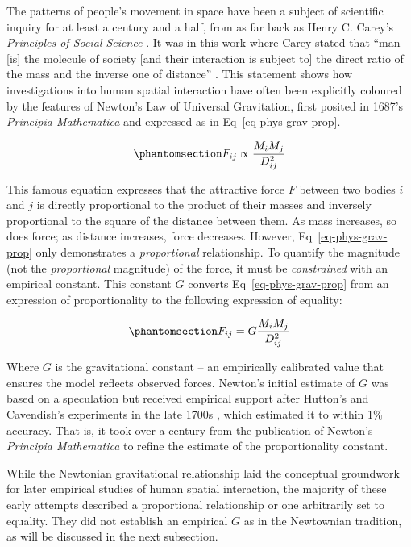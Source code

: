 \documentclass[
  10pt,
  letterpaper,
]{article}
\begin{document}
The patterns of people's movement in space have been a subject of
scientific inquiry for at least a century and a half, from as far back
as Henry C. Carey's \emph{Principles of Social Science}
\citep{careyPrinciplesSocialScience1858}. It was in this work where
Carey stated that ``man {[}is{]} the molecule of society {[}and their
interaction is subject to{]} the direct ratio of the mass and the
inverse one of distance'' \citep[pp.~37-38]{mckeanManual1883}. This
statement shows how investigations into human spatial interaction have
often been explicitly coloured by the features of Newton's Law of
Universal Gravitation, first posited in 1687's \emph{Principia
Mathematica} and expressed as in Eq~\ref{eq-phys-grav-prop}.

\begin{equation}\phantomsection\label{eq-phys-grav-prop}{
F_{ij} \propto \frac{M_i M_j} {D_{ij}^{2}}
}\end{equation}

This famous equation expresses that the attractive force \(F\) between
two bodies \(i\) and \(j\) is directly proportional to the product of
their masses and inversely proportional to the square of the distance
between them. As mass increases, so does force; as distance increases,
force decreases. However, Eq~\ref{eq-phys-grav-prop} only demonstrates a
\emph{proportional} relationship. To quantify the magnitude (not the
\emph{proportional} magnitude) of the force, it must be
\emph{constrained} with an empirical constant. This constant \(G\)
converts Eq~\ref{eq-phys-grav-prop} from an expression of
proportionality to the following expression of equality:

\begin{equation}\phantomsection\label{eq-phys-grav}{
F_{ij} = G \frac{M_i M_j} {D_{ij}^{2}}
}\end{equation}

Where \(G\) is the gravitational constant -- an empirically calibrated
value that ensures the model reflects observed forces. Newton's initial
estimate of \(G\) was based on a speculation but received empirical
support after Hutton's and Cavendish's experiments in the late 1700s
\citep{hutton_xxxiii_1778, cavendish_xxi_1798}, which estimated it to
within 1\% accuracy. That is, it took over a century from the
publication of Newton's \emph{Principia Mathematica} to refine the
estimate of the proportionality constant.

While the Newtonian gravitational relationship laid the conceptual
groundwork for later empirical studies of human spatial interaction, the
majority of these early attempts described a proportional relationship
or one arbitrarily set to equality. They did not establish an empirical
\(G\) as in the Newtownian tradition, as will be discussed in the next
subsection.
\end{document}
